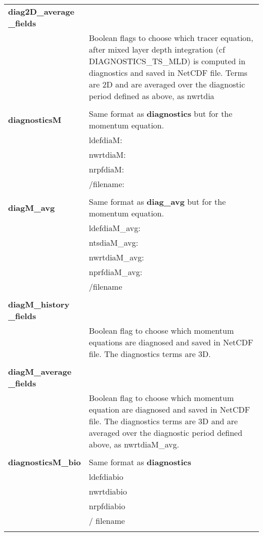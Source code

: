 \begin{longtable}{|p{0.25\linewidth}|p{0.75\linewidth}|}
\large{\textbf{diag2D\_average \_fields}} &     \\
& Boolean flags to choose which tracer equation, after mixed layer depth integration (cf
DIAGNOSTICS\_TS\_MLD) is computed in diagnostics and saved in NetCDF file. Terms are 2D
and are averaged over the diagnostic period defined as above, as nwrtdia\\
& \\


\large{\textbf{diagnosticsM}} &   Same format as \large{\textbf{diagnostics}} but for the momentum equation. \\
&ldefdiaM:     \\
&nwrtdiaM:     \\
&nrpfdiaM:     \\
&/filename:    \\
&  \\ 

\large{\textbf{diagM\_avg}} &  Same format as \large{\textbf{diag\_avg}} but for the momentum equation. \\
&ldefdiaM\_avg:     \\
&ntsdiaM\_avg:      \\
&nwrtdiaM\_avg:     \\
&nprfdiaM\_avg:     \\
&/filename          \\
&  \\ 

\large{\textbf{diagM\_history \_fields}} &     \\
& Boolean  flag to choose which momentum equations are diagnosed and saved in NetCDF
file. The diagnostics terms are 3D. \\
& \\


\large{\textbf{diagM\_average \_fields}} &     \\
& Boolean flag to choose which momentum equation are diagnosed and saved in NetCDF
file. The diagnostics terms are 3D and are averaged over the diagnostic
period defined above, as nwrtdiaM\_avg.\\
& \\



\large{\textbf{diagnosticsM\_bio}} & Same format as \large{\textbf{diagnostics}}     \\
&ldefdiabio   \\
&nwrtdiabio   \\
&nrpfdiabio   \\
&/ filename    \\
&  \\ 


\end{longtable}
